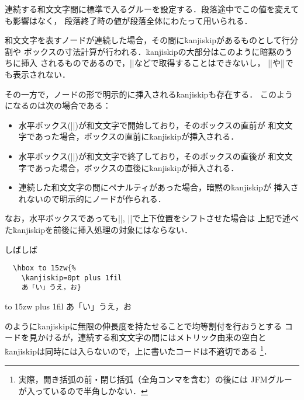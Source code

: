 \documentclass[a4paper,11pt,nomag,dvipdfmx]{jsarticle}
\begin{document}
\begin{cslist}
\csitem[\.{kanjiskip}=<skip>]
  連続する和文文字間に標準で入るグルーを設定する．段落途中でこの値を変えても影響はなく，
  段落終了時の値が段落全体にわたって用いられる．
\end{cslist}

\begin{dangerous}
 和文文字を表すノードが連続した場合，その間に\.{kanjiskip}があるものとして行分割や
 ボックスの寸法計算が行われる．\.{kanjiskip}の大部分はこのように暗黙のうちに挿入
 されるものであるので，|\lastskip|などで取得することはできないし，
 |\showlists|や|\showbox|でも表示されない．

  その一方で，ノードの形で明示的に挿入される\.{kanjiskip}も存在する．
  このようになるのは次の場合である：
 \begin{itemize}
  \item 水平ボックス(|\hbox|)が和文文字で開始しており，そのボックスの直前が
    和文文字であった場合，ボックスの直前に\.{kanjiskip}が挿入される．
  \item 水平ボックス(|\hbox|)が和文文字で終了しており，そのボックスの直後が
    和文文字であった場合，ボックスの直後に\.{kanjiskip}が挿入される．
  \item 連続した和文文字の間にペナルティがあった場合，暗黙の\.{kanjiskip}が
    挿入されないので明示的にノードが作られる．
 \end{itemize}
 なお，水平ボックスであっても|\raise|, |\lower|で上下位置をシフトさせた場合は
 上記で述べた\.{kanjiskip}を前後に挿入処理の対象にはならない．
\end{dangerous}
\begin{dangerous}
  しばしば

  \medskip
  \begin{minipage}{.6\linewidth}
  \begin{verbatim}
  \hbox to 15zw{%
    \kanjiskip=0pt plus 1fil
    あ「い」うえ，お}
  \end{verbatim}
  \end{minipage}\hfill
  \begin{minipage}{.3\linewidth}
  \hbox to 15zw{%
    \kanjiskip=0pt plus 1fil
    あ「い」うえ，お}
  \end{minipage}

  \noindent
  のように\.{kanjiskip}に無限の伸長度を持たせることで均等割付を行おうとする
  コードを見かけるが，連続する和文文字の間にはメトリック由来の空白と
  \.{kanjiskip}は同時には入らないので，上に書いたコードは不適切である
 \footnote{実際，開き括弧の前・閉じ括弧（全角コンマを含む）の後には
 JFMグルーが入っているので半角しかない．
 }．
\end{dangerous}
\end{document}
